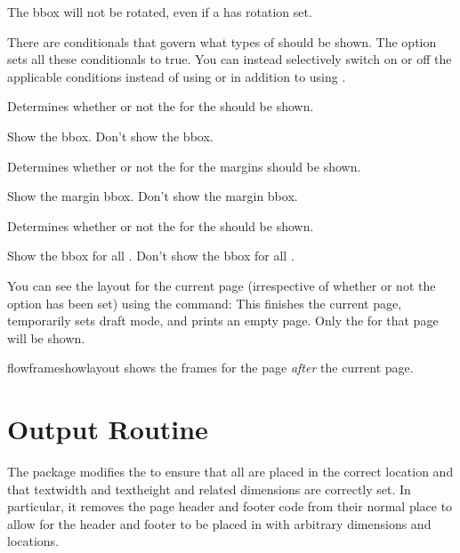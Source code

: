 \documentclass[fontsize=12pt]{scrbook}
\begin{document}
\begin{information}
The \gls*{bbox} will not be rotated, even if a  has rotation set. 
\end{information}

There are conditionals that govern what types of  should
be shown. The  option sets all these conditionals to
true. You can instead selectively switch on or off the applicable
conditions instead of using  or in addition to using
.

Determines whether or not the  for the 
should be shown.

Show the  \gls*{bbox}.
Don't show the  \gls*{bbox}.

Determines whether or not the  for the margins
should be shown.

Show the margin \gls*{bbox}.
Don't show the margin \gls*{bbox}.

Determines whether or not the  for the 
should be shown.

Show the \gls*{bbox} for all .
Don't show the \gls*{bbox} for all .

You can see the layout for the current page (irrespective of
whether or not the  option has been set) using
the command:
This finishes the current page, temporarily sets draft mode, and
prints an empty page. Only the  for that page will be
shown.

\begin{information}
\gls{flowframeshowlayout} shows the frames for the page \emph{after}
the current page.
\end{information}

\section{Output Routine}\label{sec:outputroutine}

The  package modifies the  to ensure
that all  are placed in the correct location and that
\gls{textwidth} and \gls{textheight} and related dimensions are
correctly set. In particular, it removes the page header and
footer code from their normal place to allow for the header and
footer to be placed in  with arbitrary
dimensions and locations.
\end{document}
